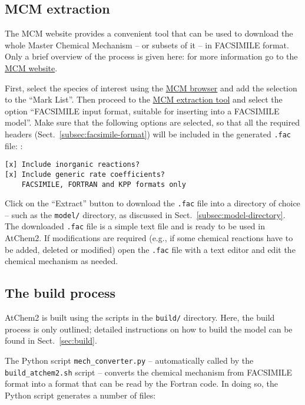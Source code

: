 \subsection{MCM extraction} \label{subsec:mcm-extraction}

The MCM website provides a convenient tool that can be used to
download the whole Master Chemical Mechanism -- or subsets of it -- in
FACSIMILE format. Only a brief overview of the process is given here:
for more information go to the \href{http://mcm.york.ac.uk}{MCM website}.

First, select the species of interest using the
\href{http://mcm.york.ac.uk/roots.htt}{MCM browser} and add the
selection to the ``Mark List''. Then proceed to the
\href{http://mcm.york.ac.uk/extract.htt}{MCM extraction tool} and
select the option ``FACSIMILE input format, suitable for inserting
into a FACSIMILE model''. Make sure that the following options are
selected, so that all the required headers
(Sect.~\ref{subsec:facsimile-format}) will be included in the
generated \texttt{.fac} file: :

\begin{verbatim}
[x] Include inorganic reactions?
[x] Include generic rate coefficients?
    FACSIMILE, FORTRAN and KPP formats only
\end{verbatim}

Click on the ``Extract'' button to download the \texttt{.fac} file
into a directory of choice -- such as the \texttt{model/} directory,
as discussed in Sect.~\ref{subsec:model-directory}. The downloaded
\texttt{.fac} file is a simple text file and is ready to be used in
AtChem2. If modifications are required (e.g., if some chemical
reactions have to be added, deleted or modified) open the
\texttt{.fac} file with a text editor and edit the chemical mechanism
as needed.

\subsection{The build process} \label{subsec:build-process}

AtChem2 is built using the scripts in the \texttt{build/}
directory. Here, the build process is only outlined; detailed
instructions on how to build the model can be found in
Sect.~\ref{sec:build}.

The Python script \texttt{mech\_converter.py} -- automatically called
by the \texttt{build\_atchem2.sh} script -- converts the chemical
mechanism from FACSIMILE format into a format that can be read by the
Fortran code. In doing so, the Python script generates a number of
files:

